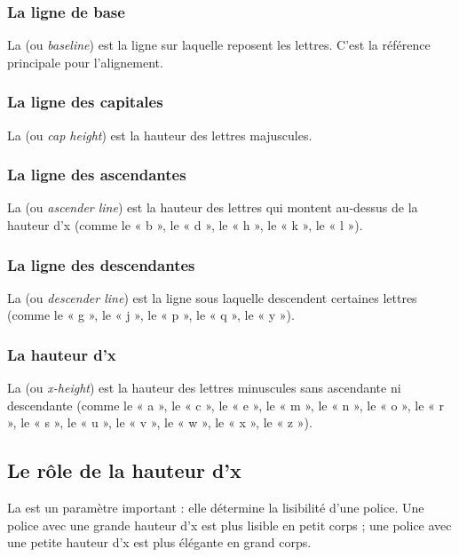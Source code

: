 \subsubsection{La ligne de base}

La  (ou \emph{baseline}) est la ligne sur laquelle reposent les lettres. C'est la référence principale pour l'alignement.

\subsubsection{La ligne des capitales}

La  (ou \emph{cap height}) est la hauteur des lettres majuscules.

\subsubsection{La ligne des ascendantes}

La  (ou \emph{ascender line}) est la hauteur des lettres qui montent au-dessus de la hauteur d'x (comme le « b », le « d », le « h », le « k », le « l »).

\subsubsection{La ligne des descendantes}

La  (ou \emph{descender line}) est la ligne sous laquelle descendent certaines lettres (comme le « g », le « j », le « p », le « q », le « y »).

\subsubsection{La hauteur d'x}

La  (ou \emph{x-height}) est la hauteur des lettres minuscules sans ascendante ni descendante (comme le « a », le « c », le « e », le « m », le « n », le « o », le « r », le « s », le « u », le « v », le « w », le « x », le « z »).

\subsection{Le rôle de la hauteur d'x}

La  est un paramètre important : elle détermine la lisibilité d'une police. Une police avec une grande hauteur d'x est plus lisible en petit corps ; une police avec une petite hauteur d'x est plus élégante en grand corps.

